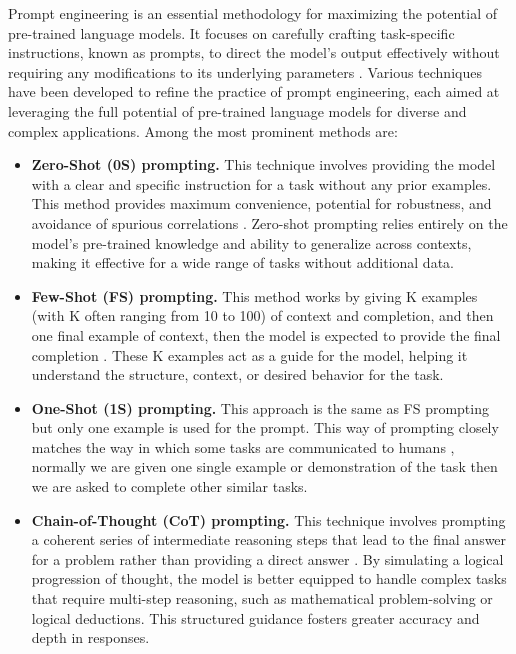 Prompt engineering is an essential methodology for maximizing the potential of pre-trained language models. It focuses on carefully crafting task-specific instructions, known as prompts, to direct the model's output effectively without requiring any modifications to its underlying parameters \cite{surveypromptengineering}. Various techniques have been developed to refine the practice of prompt engineering, each aimed at leveraging the full potential of pre-trained language models for diverse and complex applications. Among the most prominent methods are:
\begin{itemize}
    \item \textbf{Zero-Shot (0S) prompting.} This technique involves providing the model with a clear and specific instruction for a task without any prior examples. This method provides maximum convenience, potential for robustness, and avoidance of spurious correlations \cite{fewshot}. Zero-shot prompting relies entirely on the model's pre-trained knowledge and ability to generalize across contexts, making it effective for a wide range of tasks without additional data.
    \item \textbf{Few-Shot (FS) prompting.} This method works by giving K examples (with K often ranging from 10 to 100) of context and completion, and then one final example of context, then the model is expected to provide the final completion \cite{fewshot}. These K examples act as a guide for the model, helping it understand the structure, context, or desired behavior for the task.
    \item \textbf{One-Shot (1S) prompting.} This approach is the same as FS prompting but only one example is used for the prompt. This way of prompting closely matches the way in which some tasks are communicated to humans \cite{fewshot}, normally we are given one single example or demonstration of the task then we are asked to complete other similar tasks.
    \item \textbf{Chain-of-Thought (CoT) prompting.} This technique involves prompting a coherent series of intermediate reasoning steps that lead to the final answer for a problem rather than providing a direct answer \cite{chainofthought}. By simulating a logical progression of thought, the model is better equipped to handle complex tasks that require multi-step reasoning, such as mathematical problem-solving or logical deductions. This structured guidance fosters greater accuracy and depth in responses.

\end{itemize}


